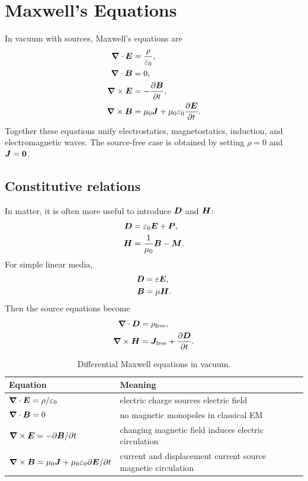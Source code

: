 \newpage

\section{Maxwell's Equations}
\label{sec:maxwell}

In vacuum with sources, Maxwell's equations are
\begin{align}
  \bm{\nabla} \cdot \bm{E}
  &=
  \frac{\rho}{\varepsilon_0},
  \label{eq:maxwell-gauss-electric}
  \\
  \bm{\nabla} \cdot \bm{B}
  &=
  0,
  \label{eq:maxwell-gauss-magnetic}
  \\
  \bm{\nabla} \times \bm{E}
  &=
  -
  \frac{\partial \bm{B}}{\partial t},
  \label{eq:maxwell-faraday}
  \\
  \bm{\nabla} \times \bm{B}
  &=
  \mu_0\bm{J}
  +
  \mu_0\varepsilon_0
  \frac{\partial\bm{E}}{\partial t}.
  \label{eq:maxwell-ampere-final}
\end{align}
Together these equations unify electrostatics, magnetostatics, induction, and electromagnetic waves.
The source-free case is obtained by setting \(\rho=0\) and \(\bm{J}=\bm{0}\).

\subsection{Constitutive relations}

In matter, it is often more useful to introduce \(\bm{D}\) and \(\bm{H}\):
\begin{align}
  \bm{D} &= \varepsilon_0 \bm{E} + \bm{P}, \\
  \bm{H} &= \frac{1}{\mu_0}\bm{B} - \bm{M}.
\end{align}
For simple linear media,
\begin{align}
  \bm{D} &= \varepsilon \bm{E}, \\
  \bm{B} &= \mu \bm{H}.
\end{align}
Then the source equations become
\begin{align}
  \bm{\nabla} \cdot \bm{D} &= \rho_{\mathrm{free}}, \\
  \bm{\nabla} \times \bm{H} &= \bm{J}_{\mathrm{free}} + \frac{\partial \bm{D}}{\partial t}.
\end{align}

\begin{table}[h]
\centering
\caption{Differential Maxwell equations in vacuum.}
\label{tab:maxwell}
\begin{tabular}{ll}
\toprule
Equation & Meaning \\
\midrule
\(\bm{\nabla} \cdot\bm{E}=\rho/\varepsilon_0\) & electric charge sources electric field \\
\(\bm{\nabla} \cdot\bm{B}=0\) & no magnetic monopoles in classical EM \\
\(\bm{\nabla} \times\bm{E}=-\partial\bm{B}/\partial t\) & changing magnetic field induces electric circulation \\
\(\bm{\nabla} \times\bm{B}=\mu_0\bm{J}+\mu_0\varepsilon_0\partial\bm{E}/\partial t\) & current and displacement current source magnetic circulation \\
\bottomrule
\end{tabular}
\end{table}

